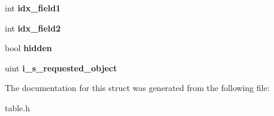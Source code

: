 \begin{DoxyCompactItemize}
\item 
\mbox{\label{structst__schema__table_a1ade05a6a4a1490c1d5476deb9b7d059}} 
int {\bfseries idx\+\_\+field1}
\item 
\mbox{\label{structst__schema__table_ad018492fc36ac0ce0a271d49ca65db5b}} 
int {\bfseries idx\+\_\+field2}
\item 
\mbox{\label{structst__schema__table_ad3617cd018fdaa7769097eb09cf54299}} 
bool {\bfseries hidden}
\item 
\mbox{\label{structst__schema__table_a45eb920674e1b13b156d737b0747462c}} 
uint {\bfseries i\+\_\+s\+\_\+requested\+\_\+object}
\end{DoxyCompactItemize}


The documentation for this struct was generated from the following file\+:\begin{DoxyCompactItemize}
\item 
table.\+h\end{DoxyCompactItemize}
